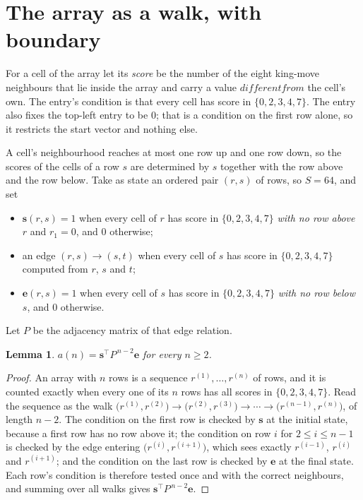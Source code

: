 \documentclass[11pt,a4paper]{article}
\theoremstyle{plain}
\newtheorem{lemma}[theorem]{Lemma}
\theoremstyle{definition}
\begin{document}
\section{The array as a walk, with boundary}

For a cell of the array let its \emph{score} be the number of the eight king-move neighbours that lie inside
the array and carry a value $different from$ the cell's own. The entry's condition is that every cell
has score in $\{0,2,3,4,7\}$. The entry also fixes the top-left entry to be $0$; that is a condition on the first row alone, so it restricts the start vector and nothing else.

A cell's neighbourhood reaches at most one row up and one row down, so the scores of the
cells of a row $s$ are determined by $s$ together with the row above and the row below.
Take as state an ordered pair $(r,s)$ of rows, so $S=64$, and set
\begin{itemize}
\item $\mathbf{s}(r,s)=1$ when every cell of $r$ has score in $\{0,2,3,4,7\}$ \emph{with no row
above $r$} and $r_1=0$, and $0$ otherwise;
\item an edge $(r,s)\to(s,t)$ when every cell of $s$ has score in $\{0,2,3,4,7\}$ computed from
$r$, $s$ and $t$;
\item $\mathbf{e}(r,s)=1$ when every cell of $s$ has score in $\{0,2,3,4,7\}$ \emph{with no row
below $s$}, and $0$ otherwise.
\end{itemize}
Let $P$ be the adjacency matrix of that edge relation.

\begin{lemma}\label{lem:walk}
$a(n)=\mathbf{s}^{\!\top}P^{\,n-2}\mathbf{e}$ for every $n\ge2$.
\end{lemma}

\begin{proof}
An array with $n$ rows is a sequence $r^{(1)},\dots,r^{(n)}$ of rows, and it is counted
exactly when every one of its $n$ rows has all scores in $\{0,2,3,4,7\}$. Read the sequence as the
walk $\bigl(r^{(1)},r^{(2)}\bigr)\to\bigl(r^{(2)},r^{(3)}\bigr)\to\cdots\to
\bigl(r^{(n-1)},r^{(n)}\bigr)$, of length $n-2$. The condition on the first row is
checked by $\mathbf{s}$ at the initial state, because a first row has no row above it; the
condition on row $i$ for $2\le i\le n-1$ is checked by the edge entering
$\bigl(r^{(i)},r^{(i+1)}\bigr)$, which sees exactly $r^{(i-1)}$, $r^{(i)}$ and
$r^{(i+1)}$; and the condition on the last row is checked by $\mathbf{e}$ at the final
state. Each row's condition is therefore tested once and with the correct neighbours, and
summing over all walks gives $\mathbf{s}^{\!\top}P^{\,n-2}\mathbf{e}$.
\end{proof}
\end{document}
